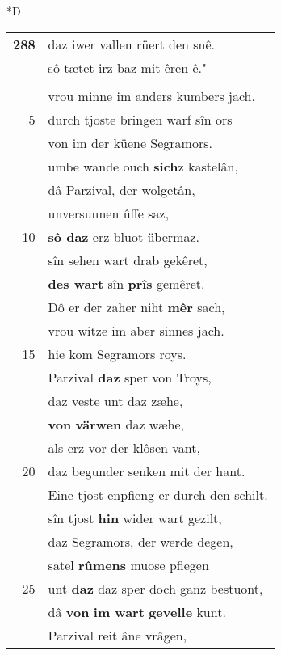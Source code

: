 \documentclass[8pt,a4paper,notitlepage]{article}
\begin{document}
\begin{table}[ht]
\begin{minipage}[t]{0.5\linewidth}
\small
\begin{center}*D
\end{center}
\begin{tabular}{rl}
\textbf{288} & daz iwer vallen rüert den snê.\\ 
 & sô tætet irz baz mit êren ê."\\ 
 & \textit{\begin{large}P\end{large}}arzival durch drô niht sprach.\\ 
 & vrou minne im anders kumbers jach.\\ 
5 & durch tjoste bringen warf sîn ors\\ 
 & von im der küene Segramors.\\ 
 & umbe wande ouch \textbf{sich}z kastelân,\\ 
 & dâ Parzival, der wolgetân,\\ 
 & unversunnen ûffe saz,\\ 
10 & \textbf{sô daz} erz bluot übermaz.\\ 
 & sîn sehen wart drab gekêret,\\ 
 & \textbf{des wart} sîn \textbf{prîs} gemêret.\\ 
 & Dô er der zaher niht \textbf{mêr} sach,\\ 
 & vrou witze im aber sinnes jach.\\ 
15 & hie kom Segramors roys.\\ 
 & Parzival \textbf{daz} sper von Troys,\\ 
 & daz veste unt daz zæhe,\\ 
 & \textbf{von} \textbf{värwen} daz wæhe,\\ 
 & als erz vor der klôsen vant,\\ 
20 & daz begunder senken mit der hant.\\ 
 & Eine tjost enpfieng er durch den schilt.\\ 
 & sîn tjost \textbf{hin} wider wart gezilt,\\ 
 & daz Segramors, der werde degen,\\ 
 & satel \textbf{rûmens} muose pflegen\\ 
25 & unt \textbf{daz} daz sper doch ganz bestuont,\\ 
 & dâ \textbf{von} \textbf{im wart} \textbf{gevelle} kunt.\\ 
 & Parzival reit âne vrâgen,\\ 

\end{tabular}
\end{minipage}
\end{table}
\end{document}
